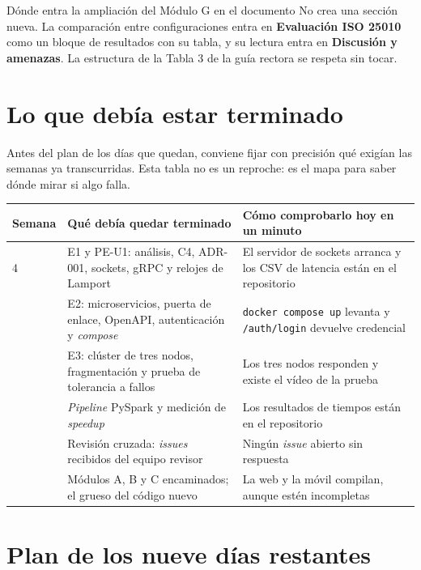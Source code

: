 \documentclass[11pt,a4paper]{article}
\begin{document}
\begin{avisoBox}{Dónde entra la ampliación del Módulo G en el documento}
	No crea una sección nueva. La comparación entre configuraciones entra en \textbf{Evaluación ISO 25010} como un bloque de resultados con su tabla, y su lectura entra en \textbf{Discusión y amenazas}. La estructura de la Tabla 3 de la guía rectora se respeta sin tocar.
\end{avisoBox}

\section{Lo que debía estar terminado}

Antes del plan de los días que quedan, conviene fijar con precisión qué exigían las semanas ya transcurridas. Esta tabla no es un reproche: es el mapa para saber dónde mirar si algo falla.

\begin{center}
	\small
	\begin{tabular}{@{}p{1.8cm}p{5.8cm}p{7.3cm}@{}}
		\toprule
		\textbf{Semana} & \textbf{Qué debía quedar terminado} & \textbf{Cómo comprobarlo hoy en un minuto} \\
		\midrule
		4 & E1 y PE-U1: análisis, C4, ADR-001, sockets, gRPC y relojes de Lamport & El servidor de sockets arranca y los CSV de latencia están en el repositorio \\
		\addlinespace
		7 & E2: microservicios, puerta de enlace, OpenAPI, autenticación y \emph{compose} & \texttt{docker compose up} levanta y \texttt{/auth/login} devuelve credencial \\
		\addlinespace
		11 & E3: clúster de tres nodos, fragmentación y prueba de tolerancia a fallos & Los tres nodos responden y existe el vídeo de la prueba \\
		\addlinespace
		14 & \emph{Pipeline} PySpark y medición de \emph{speedup} & Los resultados de tiempos están en el repositorio \\
		\addlinespace
		16 & Revisión cruzada: \emph{issues} recibidos del equipo revisor & Ningún \emph{issue} abierto sin respuesta \\
		\addlinespace
		17 & Módulos A, B y C encaminados; el grueso del código nuevo & La web y la móvil compilan, aunque estén incompletas \\
		\bottomrule
	\end{tabular}
\end{center}

\section{Plan de los nueve días restantes}
\end{document}
